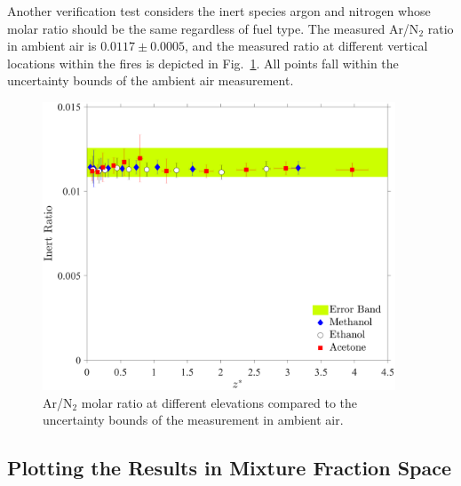 \documentclass[12pt]{article}
\begin{document}
Another verification test considers the inert species argon and nitrogen whose molar ratio should be the same regardless of fuel type. The measured Ar/N$_2$ ratio in ambient air is $0.0117\pm0.0005$, and the measured ratio at different vertical locations within the fires is depicted in Fig.~\ref{fig:IR}. All points fall within the uncertainty bounds of the ambient air measurement.
\begin{figure}[h!]
	\centering
\includegraphics[width=10.5cm, keepaspectratio]{Inert_ratio_Comparison.pdf}
	\caption[Ar/N$_2$ ratio within the fire envelop compared to ambient air]{Ar/N$_2$ molar ratio at different elevations compared to the uncertainty bounds of the measurement in ambient air.}
	\label{fig:IR}
\end{figure}


\subsection{Plotting the Results in Mixture Fraction Space}
\label{ssec:Mixture_Fraction_Results}
\end{document}
